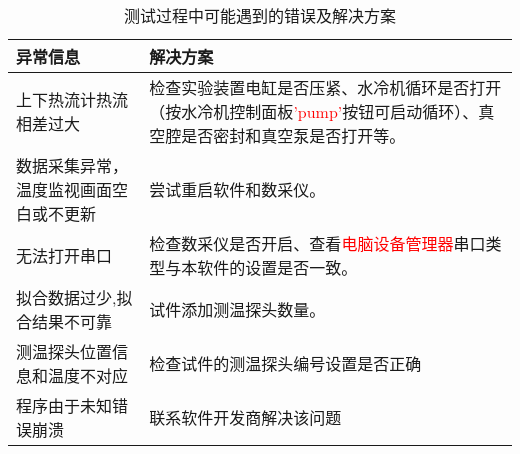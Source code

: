 \begin{table}[htbp]
    \centering
    \caption{ 测试过程中可能遇到的错误及解决方案 \label{tab:errorInfo}}
    \begin{tabular}{@{}p{3cm}p{10cm}@{}}
        \toprule
        异常信息                               & 解决方案                                                                                                                                  \\ \midrule
        上下热流计热流相差过大                 & 检查实验装置电缸是否压紧、水冷机循环是否打开（按水冷机控制面板\textcolor{red}{'pump'}按钮可启动循环）、真空腔是否密封和真空泵是否打开等。 \\
        数据采集异常，温度监视画面空白或不更新 & 尝试重启软件和数采仪。                                                                                                                    \\
        无法打开串口                           & 检查数采仪是否开启、查看\textcolor{red}{电脑设备管理器}串口类型与本软件的设置是否一致。                                                   \\
        拟合数据过少,拟合结果不可靠            & 试件添加测温探头数量。                                                                                                                    \\
        测温探头位置信息和温度不对应           & 检查试件的测温探头编号设置是否正确                                                                                                        \\
        程序由于未知错误崩溃                   & 联系软件开发商解决该问题                                                                                                                  \\
        \bottomrule
    \end{tabular}
\end{table}

